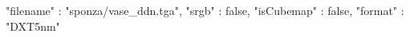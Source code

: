 { 
	"filename" : "sponza/vase_ddn.tga", 
	"srgb" : false,
	"isCubemap" : false,
	"format" : "DXT5nm"
}